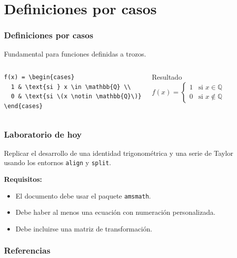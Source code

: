 \documentclass[12pt,aspectratio=169,ignorenonframetext]{ltxbeamer}
\begin{document}
\section{Definiciones por casos}
\begin{frame}[fragile]
    \frametitle{Definiciones por casos}
    Fundamental para funciones definidas a trozos.

    \begin{columns}
\begin{verbatim}
f(x) = \begin{cases}
  1 & \text{si } x \in \mathbb{Q} \\
  0 & \text{si \(x \notin \mathbb{Q}\)}
\end{cases}
\end{verbatim}

        \begin{exampleblock}{Resultado}
            \begin{equation*}
                f(x) = \begin{cases}
                    1 & \text{si } x \in \mathbb{Q} \\
                    0 & \text{si  \(x \notin \mathbb{Q}\)}
                \end{cases}
            \end{equation*}
        \end{exampleblock}
    \end{columns}
\end{frame}



\begin{frame}
    \frametitle{Laboratorio de hoy}
    Replicar el desarrollo de una identidad trigonométrica y una serie de Taylor usando los entornos \texttt{align} y \texttt{split}.

    \bigskip
    \textbf{Requisitos:}
    \begin{itemize}
        \item El documento debe usar el paquete \texttt{amsmath}.
        \item Debe haber al menos una ecuación con numeración personalizada.
        \item Debe incluirse una matriz de transformación.
    \end{itemize}
\end{frame}



\begin{frame}[allowframebreaks]
\frametitle{Referencias}
\nocite{*}
\printbibliography
\end{frame}
\end{document}
